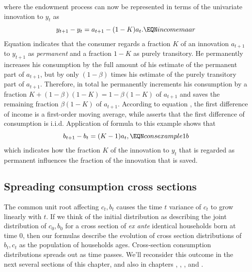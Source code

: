 where the endowment process can now be represented in terms of the univariate innovation to $y_t$ as
$$ y_{t+1} - y_t = a_{t+1} - (1-K) a_t. \EQN incomemaar $$
Equation  indicates that the consumer regards a fraction $K$ of an innovation $a_{t+1}$ to $y_{t+1}$
as {\it permanent} and a fraction $1-K$ as purely transitory. He permanently increases his consumption by the full amount of his estimate of the permanent part of $a_{t+1}$,
but by only $(1-\beta)$ times his estimate of the purely transitory part of $a_{t+1}$.   Therefore, in total  he permanently increments his  consumption by
 a fraction $K + (1-\beta) (1-K) = 1 - \beta (1-K)$  of $a_{t+1}$ and saves the remaining fraction $\beta (1-K)$ of $a_{t+1}$.
  According to equation , the first difference of income is a first-order moving average, while 
  asserts that the first difference of consumption is   i.i.d.
  Application of formula 
to this example shows that
$$ b_{t+1} - b_t = (K-1) a_t , \EQN consexample1b $$
which indicates how the fraction $K$ of the innovation to $y_t$ that is regarded as permanent influences the fraction of the innovation that is saved.



\subsection{Spreading consumption cross sections}
The common  unit root affecting $c_t, b_t$  causes  the time $t$ variance of $c_t$ to grow linearly with $t$.
If we think of the initial distribution as describing the joint distribution of $c_0, b_0$ for a cross section
of {\it ex ante} identical households born at time $0$, then our  formulas  describe the evolution of  cross section distributions of  $b_t, c_t$ as the population of households ages.  Cross-section consumption distributions  spreads out as time passes. We'll reconsider this outcome in the next several  sections of this chapter, and also in chapters , , ,  and
. 






